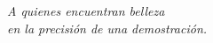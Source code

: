 \thispagestyle{empty}
\vspace*{2in}
\begin{flushright}
\itshape
A quienes encuentran belleza\\
en la precisión de una demostración.
\end{flushright}
\clearpage
